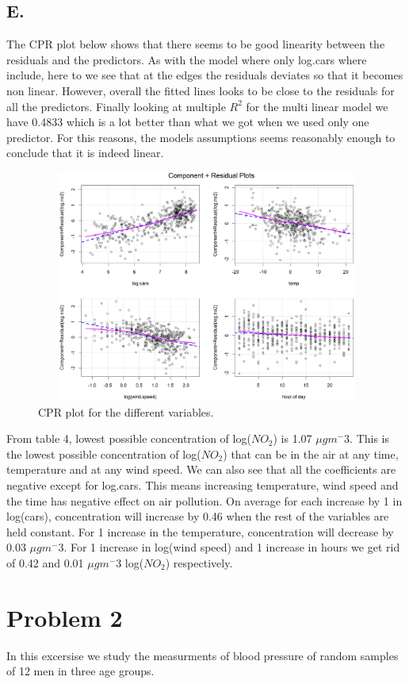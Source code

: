 \documentclass[a4paper,12pt]{article}
\begin{document}
\subsection*{E. }
The CPR plot below shows that there seems to be good linearity between the residuals and the predictors. As with the model where only log.cars where include, here to we see that at the edges the residuals deviates so that it becomes non linear. However, overall the fitted lines looks to be close to the residuals for all the predictors. Finally looking at multiple $R^2 $ for the multi linear model we have 0.4833 which is a lot better than what we got when we used only one predictor. For this reasons, the models assumptions seems reasonably enough to conclude that it is indeed linear.

\begin{figure}[H]
\centerline{\includegraphics[width=5in, height=3in]{CPR_plot(D).png}}
\caption{CPR plot for the different variables.}
\label{fig}
\end{figure}

From table 4, lowest possible concentration of log($NO_2$) is 1.07 $\mu gm^-3 $. This is the lowest possible concentration of log($NO_2$) that can be in the air at any time, temperature and at any wind speed.  We can also see that all the coefficients are negative except for log.cars. This means increasing temperature, wind speed and the time has negative effect on air pollution. On average for each increase by 1 in log(cars), concentration will increase by 0.46 when the rest of the variables are held constant. For 1 increase in the temperature, concentration will decrease by 0.03 $\mu gm^-3 $. For 1 increase in log(wind speed) and 1 increase in hours we get rid of 0.42 and 0.01 $\mu gm^-3 $ log($NO_2$) respectively. 


\section*{Problem 2}
In this excersise we study the measurments of blood pressure of random samples of 12 men in three age groups. 
\end{document}
